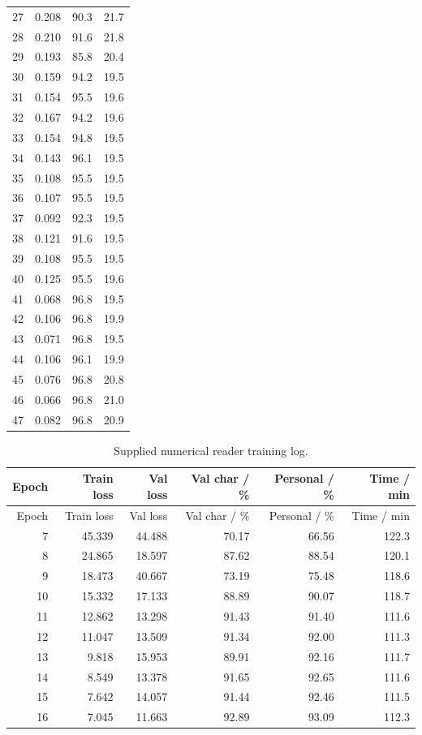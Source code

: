 \begin{longtable}{rrrr}
27 & 0.208 & 90.3 & 21.7\\
28 & 0.210 & 91.6 & 21.8\\
29 & 0.193 & 85.8 & 20.4\\
30 & 0.159 & 94.2 & 19.5\\
31 & 0.154 & 95.5 & 19.6\\
32 & 0.167 & 94.2 & 19.6\\
33 & 0.154 & 94.8 & 19.5\\
34 & 0.143 & 96.1 & 19.5\\
35 & 0.108 & 95.5 & 19.5\\
36 & 0.107 & 95.5 & 19.5\\
37 & 0.092 & 92.3 & 19.5\\
38 & 0.121 & 91.6 & 19.5\\
39 & 0.108 & 95.5 & 19.5\\
40 & 0.125 & 95.5 & 19.6\\
41 & 0.068 & 96.8 & 19.5\\
42 & 0.106 & 96.8 & 19.9\\
43 & 0.071 & 96.8 & 19.5\\
44 & 0.106 & 96.1 & 19.9\\
45 & 0.076 & 96.8 & 20.8\\
46 & 0.066 & 96.8 & 21.0\\
47 & 0.082 & 96.8 & 20.9\\
\bottomrule\end{longtable}
\begin{longtable}{rrrrrr}
\caption{Supplied numerical reader training log.}\label{tab:app-reader-log}\\
\toprule Epoch & Train loss & Val loss & Val char / \% & Personal / \% & Time / min\\\midrule\endfirsthead
\toprule Epoch & Train loss & Val loss & Val char / \% & Personal / \% & Time / min\\\midrule\endhead
7 & 45.339 & 44.488 & 70.17 & 66.56 & 122.3\\
8 & 24.865 & 18.597 & 87.62 & 88.54 & 120.1\\
9 & 18.473 & 40.667 & 73.19 & 75.48 & 118.6\\
10 & 15.332 & 17.133 & 88.89 & 90.07 & 118.7\\
11 & 12.862 & 13.298 & 91.43 & 91.40 & 111.6\\
12 & 11.047 & 13.509 & 91.34 & 92.00 & 111.3\\
13 & 9.818 & 15.953 & 89.91 & 92.16 & 111.7\\
14 & 8.549 & 13.378 & 91.65 & 92.65 & 111.6\\
15 & 7.642 & 14.057 & 91.44 & 92.46 & 111.5\\
16 & 7.045 & 11.663 & 92.89 & 93.09 & 112.3\\
\bottomrule\end{longtable}
